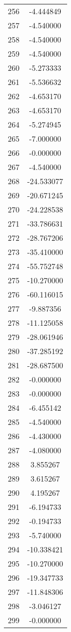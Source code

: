 \documentclass[12pt]{article}
\begin{document}
\begin{longtable}{@{}cc@{}}
256 & -4.444849 \\
257 & -4.540000 \\
258 & -4.540000 \\
259 & -4.540000 \\
260 & -5.273333 \\
261 & -5.536632 \\
262 & -4.653170 \\
263 & -4.653170 \\
264 & -5.274945 \\
265 & -7.000000 \\
266 & -0.000000 \\
267 & -4.540000 \\
268 & -24.533077 \\
269 & -20.671245 \\
270 & -24.228538 \\
271 & -33.786631 \\
272 & -28.767206 \\
273 & -35.410000 \\
274 & -55.752748 \\
275 & -10.270000 \\
276 & -60.116015 \\
277 & -9.887356 \\
278 & -11.125058 \\
279 & -28.061946 \\
280 & -37.285192 \\
281 & -28.687500 \\
282 & -0.000000 \\
283 & -0.000000 \\
284 & -6.455142 \\
285 & -4.540000 \\
286 & -4.430000 \\
287 & -4.080000 \\
288 & 3.855267 \\
289 & 3.615267 \\
290 & 4.195267 \\
291 & -6.194733 \\
292 & -0.194733 \\
293 & -5.740000 \\
294 & -10.338421 \\
295 & -10.270000 \\
296 & -19.347733 \\
297 & -11.848306 \\
298 & -3.046127 \\
299 & -0.000000 \\

\end{longtable}
\end{document}
